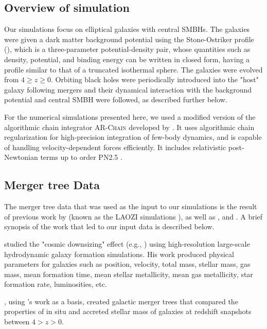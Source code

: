 \documentclass[fleqn,usenatbib,useAMS]{mnras}
\begin{document}
\subsection{Overview of simulation}
Our simulations focus on elliptical galaxies with central SMBHs. The galaxies were given a dark matter background potential using the Stone-Ostriker profile (\citet{2015ApJ...806L..28S}), which is a three-parameter potential-density pair, whose quantities such as density, potential, and binding energy can be written in closed form, having a profile similar to that of a truncated isothermal sphere.  The galaxies were evolved from $4\geq z \geq 0$.  Orbiting black holes were periodically introduced into the "host" galaxy following mergers and their dynamical interaction with the background potential and central SMBH were followed, as described further below.

For the numerical simulations presented here, we used a modified version of the algorithmic chain integrator \textsc{AR-Chain} developed by \citet{2006MNRAS.372..219M}. It uses algorithmic chain regularization for high-precision integration of few-body dynamics, and is capable of handling velocity-dependent forces efficiently. It includes relativistic post-Newtonian terms up to order PN2.5 \citep{2008AJ....135.2398M}.


\subsection{Merger tree Data}
The merger tree data that was used as the input to our simulations is the result of previous work by \citet{2011ApJ...741...99C, 2011ApJ...742L..33C, 2012ApJ...753...17C, 2012ApJ...748..121C, 2013ApJ...770..139C}  (known as the LAOZI simulations \citet{2014ApJ...781...38C}), as well as  \citet{2012MNRAS.425..641L}, and \citet{2015ApJ...799..178K}.  A brief synopsis of the work that led to our input data is described below.

\citet{2011ApJ...741...99C} studied the "cosmic downsizing" effect (e.g., \citet{1996AJ....112..839C}) using high-resolution large-scale hydrodynamic galaxy formation simulations.  His work produced physical parameters for galaxies such as position, velocity, total mass, stellar mass, gas mass, mean formation time, mean stellar metallicity, mean gas metallicity, star formation rate, luminosities, etc.

\citet{2012MNRAS.425..641L}, using \citet{2011ApJ...741...99C}'s work as a basis, created galactic merger trees that compared the properties of in situ and accreted stellar mass of galaxies at redshift snapshots between $4 > z > 0$.
\end{document}
